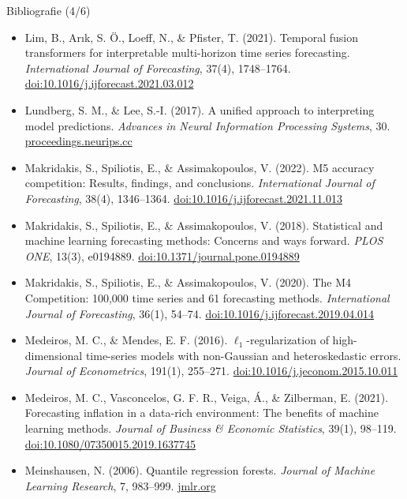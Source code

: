 \begin{frame}{Bibliografie (4/6)}
\itemsize{\tiny}
\begin{itemize}
    \item Lim, B., Arık, S. Ö., Loeff, N., \& Pfister, T. (2021). Temporal fusion transformers for interpretable multi-horizon time series forecasting. \textit{International Journal of Forecasting}, 37(4), 1748--1764. \href{https://doi.org/10.1016/j.ijforecast.2021.03.012}{doi:10.1016/j.ijforecast.2021.03.012}
    \item Lundberg, S. M., \& Lee, S.-I. (2017). A unified approach to interpreting model predictions. \textit{Advances in Neural Information Processing Systems}, 30. \href{https://proceedings.neurips.cc/paper/2017/hash/8a20a8621978632d76c43dfd28b67767-Abstract.html}{proceedings.neurips.cc}
    \item Makridakis, S., Spiliotis, E., \& Assimakopoulos, V. (2022). M5 accuracy competition: Results, findings, and conclusions. \textit{International Journal of Forecasting}, 38(4), 1346--1364. \href{https://doi.org/10.1016/j.ijforecast.2021.11.013}{doi:10.1016/j.ijforecast.2021.11.013}
    \item Makridakis, S., Spiliotis, E., \& Assimakopoulos, V. (2018). Statistical and machine learning forecasting methods: Concerns and ways forward. \textit{PLOS ONE}, 13(3), e0194889. \href{https://doi.org/10.1371/journal.pone.0194889}{doi:10.1371/journal.pone.0194889}
    \item Makridakis, S., Spiliotis, E., \& Assimakopoulos, V. (2020). The M4 Competition: 100,000 time series and 61 forecasting methods. \textit{International Journal of Forecasting}, 36(1), 54--74. \href{https://doi.org/10.1016/j.ijforecast.2019.04.014}{doi:10.1016/j.ijforecast.2019.04.014}
    \item Medeiros, M. C., \& Mendes, E. F. (2016). $\ell_1$-regularization of high-dimensional time-series models with non-Gaussian and heteroskedastic errors. \textit{Journal of Econometrics}, 191(1), 255--271. \href{https://doi.org/10.1016/j.jeconom.2015.10.011}{doi:10.1016/j.jeconom.2015.10.011}
    \item Medeiros, M. C., Vasconcelos, G. F. R., Veiga, Á., \& Zilberman, E. (2021). Forecasting inflation in a data-rich environment: The benefits of machine learning methods. \textit{Journal of Business \& Economic Statistics}, 39(1), 98--119. \href{https://doi.org/10.1080/07350015.2019.1637745}{doi:10.1080/07350015.2019.1637745}
    \item Meinshausen, N. (2006). Quantile regression forests. \textit{Journal of Machine Learning Research}, 7, 983--999. \href{https://jmlr.org/papers/v7/meinshausen06a.html}{jmlr.org}

\end{itemize}
\end{frame}
